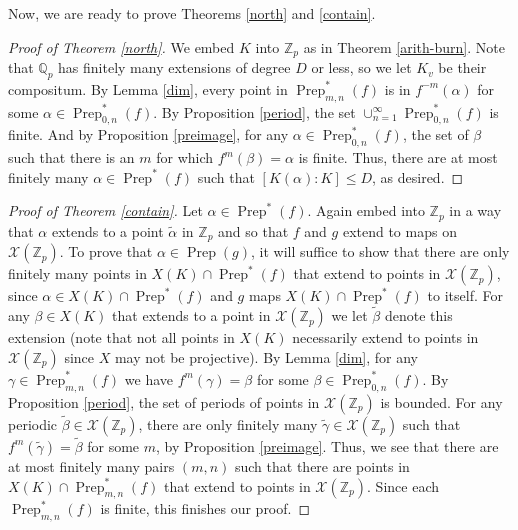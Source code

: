 \documentclass{amsart}
\newcommand{\bZ} {\mathbb{Z}}
\newcommand{\bQ}{\mathbb{Q}}
\DeclareMathOperator{\Prep}{Prep}
\newcommand{\ta}{\tilde \alpha}
\newcommand{\tb}{\tilde \beta}
\newcommand{\tg}{\tilde \gamma}
\newcommand{\cX}{\mathcal X}
\theoremstyle{definition}
\begin{document}
   Now, we are ready to prove Theorems \ref{north} and \ref{contain}.


  \begin{proof}[Proof of Theorem \ref{north}]
    We embed $K$ into $\bZ_p$ as in Theorem \ref{arith-burn}.  Note
    that $\bQ_p$ has finitely many extensions of degree $D$ or less,
    so we let $K_v$ be their compositum.  By Lemma \ref{dim}, every
    point in $\Prep^*_{m,n}(f)$ is in $f^{-m}(\alpha)$ for some
    $\alpha \in \Prep^*_{0,n}(f)$.  By Proposition \ref{period}, the
    set 
    $\cup_{n=1}^\infty \Prep^*_{0,n}(f)$ is finite.  And by
    Proposition \ref{preimage}, for any $\alpha \in \Prep^*_{0,n}(f)$,
    the set of $\beta$ such that there is an $m$ for which
    $f^m(\beta) = \alpha$ is finite.  Thus, there are at most finitely
    many $\alpha \in \Prep^*(f)$ such that $[K(\alpha) : K] \leq D$,
    as desired.
  \end{proof}

  \begin{proof}[Proof of Theorem \ref{contain}]
    Let $\alpha \in \Prep^*(f)$.  Again embed into $\bZ_p$ in a way
    that $\alpha$ extends to a point $\ta$ in $\bZ_p$ and so that $f$
    and $g$ extend to maps on $\cX(\bZ_p)$. To prove that
    $\alpha \in \Prep(g)$, it will suffice to show that there are only
    finitely many points in $X(K) \cap \Prep^*(f)$ that extend to
    points in $\cX(\bZ_p)$, since $\alpha \in X(K) \cap \Prep^*(f)$
    and $g$ maps $X(K) \cap \Prep^*(f)$ to itself. For any
    $\beta \in X(K)$ that extends to a point in $\cX(\bZ_p)$ we let
    $\tb$ denote this extension (note that not all points in $X(K)$
    necessarily extend to points in $\cX(\bZ_p)$ since $X$ may not be
    projective).  By Lemma \ref{dim}, for any
    $\gamma \in \Prep_{m,n}^*(f)$ we have $f^m(\gamma) = \beta$ for
    some $\beta \in \Prep_{0,n}^*(f)$.  By Proposition \ref{period},
    the set of periods of points in $\cX(\bZ_p)$ is bounded.  For any
    periodic $\tb \in \cX(\bZ_p)$, there are only finitely many
    $\tg \in \cX(\bZ_p)$ such that $f^m(\tg) = \tb$ for some $m$, by
    Proposition \ref{preimage}.  Thus, we see that there are at most
    finitely many pairs $(m,n)$ such that there are points in
    $X(K) \cap \Prep_{m,n}^*(f)$ that extend to points in
    $\cX(\bZ_p)$.  Since each $\Prep_{m,n}^*(f)$ is finite, this
    finishes our proof.
  \end{proof}
\end{document}

